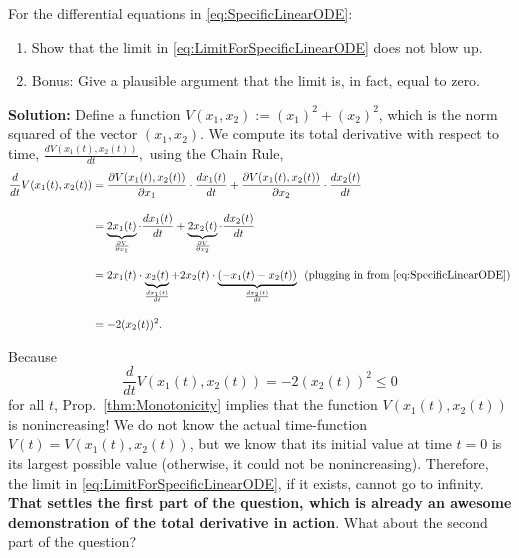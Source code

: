 \begin{example} 
\label{ex:TotalDerivativeWithODE}
For the differential equations in \eqref{eq:SpecificLinearODE}: 
\begin{enumerate} 
\renewcommand{\labelenumi}{(\alph{enumi})}
\setlength{\itemsep}{.2cm}
    \item Show that the limit in \eqref{eq:LimitForSpecificLinearODE} does not blow up.
    \item Bonus: Give a plausible argument that the limit is, in fact, equal to zero.
\end{enumerate}
    
\end{example}

\textbf{Solution:} Define a function $V(x_1, x_2):= (x_1)^2 + (x_2)^2$, which is the norm squared of the vector $(x_1, x_2)$. We compute its total derivative with respect to time, $\frac{dV(x_1(t), x_2(t))}{dt},$ using the Chain Rule,
\begin{align*}
    \frac{d}{dt}V(x_1(t), x_2(t)) &= \frac{\partial V(x_1(t), x_2(t))}{\partial x_1 } \cdot \frac{d x_1(t)}{dt} + 
     \frac{\partial V(x_1(t), x_2(t))}{\partial x_2 } \cdot \frac{d x_2(t)}{dt} \\[1em]
     &= \underbrace{2 x_1(t)}_{\frac{\partial V}{\partial x_1 }} \cdot \frac{d x_1(t)}{dt} + 
     \underbrace{2 x_2(t)}_{\frac{\partial V}{\partial x_2}} \cdot \frac{d x_2(t)}{dt} \\[1em]
     & = 2 x_1(t) \cdot \underbrace{x_2(t)}_{\frac{d x_1(t)}{dt}} + 2 x_2(t) \cdot \underbrace{(-x_1(t) - x_2(t) )}_{\frac{d x_2(t)}{dt}} ~~(\text{plugging in from \eqref{eq:SpecificLinearODE}})\\[1em]
     & = -2 (x_2(t))^2.
\end{align*}

Because 
\begin{equation}
    \frac{d}{dt}V(x_1(t), x_2(t)) =  -2 (x_2(t))^2 \le 0
\end{equation}
for all $t$, Prop.~\ref{thm:Monotonicity} implies that the function $V(x_1(t), x_2(t))$ is nonincreasing! We do not know the actual time-function $V(t) = V(x_1(t), x_2(t))$, but we know that its initial value at time $t=0$ is its largest possible value (otherwise, it could not be nonincreasing). Therefore, the limit in \eqref{eq:LimitForSpecificLinearODE}, if it exists, cannot go to infinity. \textbf{That settles the first part of the question, which is already an awesome demonstration of the total derivative in action}. What about the second part of the question? 


